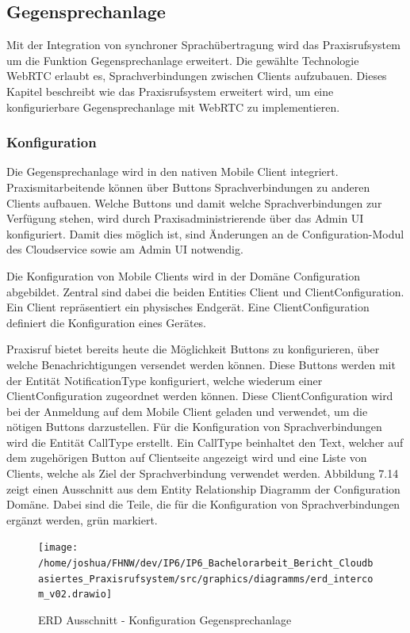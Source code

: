 \subsection{Gegensprechanlage}

Mit der Integration von synchroner Sprachübertragung wird das Praxisrufsystem um die Funktion Gegensprechanlage erweitert.
Die gewählte Technologie WebRTC erlaubt es, Sprachverbindungen zwischen Clients aufzubauen.
Dieses Kapitel beschreibt wie das Praxisrufsystem erweitert wird, um eine konfigurierbare Gegensprechanlage mit WebRTC zu implementieren.

\subsubsection{Konfiguration}

Die Gegensprechanlage wird in den nativen Mobile Client integriert.
Praxismitarbeitende können über Buttons Sprachverbindungen zu anderen Clients aufbauen.
Welche Buttons und damit welche Sprachverbindungen zur Verfügung stehen, wird durch Praxisadministrierende über das Admin UI konfiguriert.
Damit dies möglich ist, sind Änderungen an de Configuration-Modul des Cloudservice sowie am Admin UI notwendig.

Die Konfiguration von Mobile Clients wird in der Domäne Configuration abgebildet.
Zentral sind dabei die beiden Entities Client und ClientConfiguration.
Ein Client repräsentiert ein physisches Endgerät.
Eine ClientConfiguration definiert die Konfiguration eines Gerätes.

Praxisruf bietet bereits heute die Möglichkeit Buttons zu konfigurieren, über welche Benachrichtigungen versendet werden können.
Diese Buttons werden mit der Entität NotificationType konfiguriert, welche wiederum einer ClientConfiguration zugeordnet werden können.
Diese ClientConfiguration wird bei der Anmeldung auf dem Mobile Client geladen und verwendet, um die nötigen Buttons darzustellen.
Für die Konfiguration von Sprachverbindungen wird die Entität CallType erstellt.
Ein CallType beinhaltet den Text, welcher auf dem zugehörigen Button auf Clientseite angezeigt wird und eine Liste von Clients, welche als Ziel der Sprachverbindung verwendet werden.
Abbildung 7.14 zeigt einen Ausschnitt aus dem Entity Relationship Diagramm der Configuration Domäne.
Dabei sind die Teile, die für die Konfiguration von Sprachverbindungen ergänzt werden, grün markiert.

\begin{figure}[h]
    \centering
    \begin{minipage}[b]{0.7\textwidth}
        \texttt{[image: /home/joshua/FHNW/dev/IP6/IP6\_Bachelorarbeit\_Bericht\_Cloudbasiertes\_Praxisrufsystem/src/graphics/diagramms/erd\_intercom\_v02.drawio]}
        \caption{ERD Ausschnitt - Konfiguration Gegensprechanlage}
    \end{minipage}
\end{figure}


